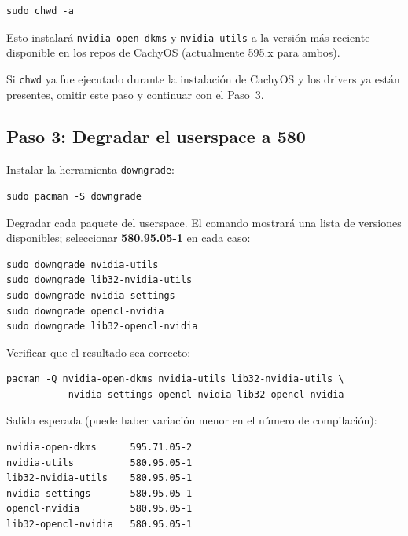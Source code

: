 \documentclass[12pt,a4paper]{article}
\begin{document}
\begin{lstlisting}[style=bash]
sudo chwd -a
\end{lstlisting}

Esto instalará \texttt{nvidia-open-dkms} y \texttt{nvidia-utils} a la versión
más reciente disponible en los repos de CachyOS (actualmente 595.x para ambos).

\begin{nota}
Si \texttt{chwd} ya fue ejecutado durante la instalación de CachyOS y los
drivers ya están presentes, omitir este paso y continuar con el Paso~3.
\end{nota}

\subsection{Paso 3: Degradar el userspace a 580}

Instalar la herramienta \texttt{downgrade}:

\begin{lstlisting}[style=bash]
sudo pacman -S downgrade
\end{lstlisting}

Degradar cada paquete del userspace. El comando mostrará una lista de
versiones disponibles; seleccionar \textbf{580.95.05-1} en cada caso:

\begin{lstlisting}[style=bash]
sudo downgrade nvidia-utils
sudo downgrade lib32-nvidia-utils
sudo downgrade nvidia-settings
sudo downgrade opencl-nvidia
sudo downgrade lib32-opencl-nvidia
\end{lstlisting}

Verificar que el resultado sea correcto:

\begin{lstlisting}[style=bash]
pacman -Q nvidia-open-dkms nvidia-utils lib32-nvidia-utils \
           nvidia-settings opencl-nvidia lib32-opencl-nvidia
\end{lstlisting}

Salida esperada (puede haber variación menor en el número de compilación):

\begin{lstlisting}
nvidia-open-dkms      595.71.05-2
nvidia-utils          580.95.05-1
lib32-nvidia-utils    580.95.05-1
nvidia-settings       580.95.05-1
opencl-nvidia         580.95.05-1
lib32-opencl-nvidia   580.95.05-1
\end{lstlisting}
\end{document}
